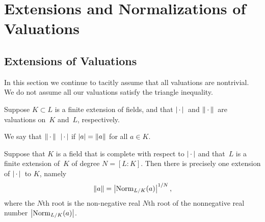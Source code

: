 \chapter{Extensions and Normalizations of Valuations}
\section{Extensions of Valuations}
In this section we continue to tacitly assume that all valuations are
nontrivial.  We do not assume all our valuations satisfy the triangle inequality.


Suppose $K\subset L$ is a finite extension of fields, and that $\left|\,\cdot\,\right|{}$ and $\left\|\,\cdot\,\right\|{}$
are valuations on~$K$ and~$L$, respectively.  
\begin{definition}[Extends]
We say that $\left\|\,\cdot\,\right\|{}$ 
$\left|\,\cdot\,\right|$ if $\left|a\right| = \left\|a\right\|$ for all $a\in K$.   
\end{definition}
\begin{theorem}\label{thm:extunique}
Suppose that $K$ is a field that is complete with respect to $\left|\,\cdot\,\right|$
and that~$L$ is a finite extension of~$K$ of degree $N=[L:K]$.   
Then there is precisely
one extension of $\left|\,\cdot\,\right|{}$ to $K$, namely
\begin{equation}
  \left\|a\right\| = \left|\operatorname{Norm}_{L/K}(a)\right|^{1/N},
\label{eqn:normdef}\end{equation}
where the $N$th root is the non-negative real $N$th root of the
nonnegative real number $\left|\operatorname{Norm}_{L/K}(a)\right|$.
\end{theorem}
